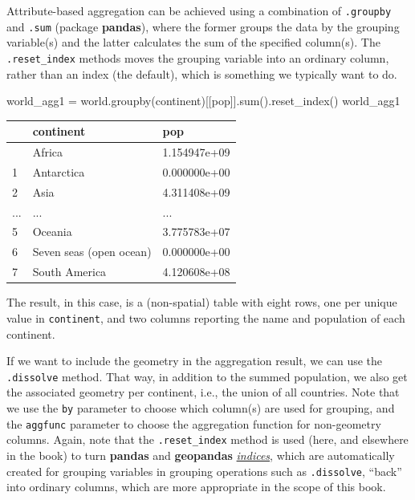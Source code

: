 \documentclass[
  letterpaper,
]{krantz}
\newenvironment{Shaded}{\begin{snugshade}}{\end{snugshade}}
\newcommand{\BuiltInTok}[1]{\textcolor[rgb]{0.00,0.23,0.31}{#1}}
\newcommand{\NormalTok}[1]{\textcolor[rgb]{0.00,0.23,0.31}{#1}}
\newcommand{\OperatorTok}[1]{\textcolor[rgb]{0.37,0.37,0.37}{#1}}
\newcommand{\StringTok}[1]{\textcolor[rgb]{0.13,0.47,0.30}{#1}}
\begin{document}
Attribute-based aggregation can be achieved using a combination of
\texttt{.groupby} and \texttt{.sum} (package \textbf{pandas}), where the
former groups the data by the grouping variable(s) and the latter
calculates the sum of the specified column(s). The
\texttt{.reset\_index} methods moves the grouping variable into an
ordinary column, rather than an index (the default), which is something
we typically want to do.

\begin{Shaded}
\begin{Highlighting}[]
\NormalTok{world\_agg1 }\OperatorTok{=}\NormalTok{ world.groupby(}\StringTok{\textquotesingle{}continent\textquotesingle{}}\NormalTok{)[[}\StringTok{\textquotesingle{}pop\textquotesingle{}}\NormalTok{]].}\BuiltInTok{sum}\NormalTok{().reset\_index()}
\NormalTok{world\_agg1}
\end{Highlighting}
\end{Shaded}

\begin{longtable}[]{@{}lll@{}}
\toprule\noalign{}
& continent & pop \\
\midrule\noalign{}
\endhead
\bottomrule\noalign{}
\endlastfoot
0 & Africa & 1.154947e+09 \\
1 & Antarctica & 0.000000e+00 \\
2 & Asia & 4.311408e+09 \\
... & ... & ... \\
5 & Oceania & 3.775783e+07 \\
6 & Seven seas (open ocean) & 0.000000e+00 \\
7 & South America & 4.120608e+08 \\
\end{longtable}

The result, in this case, is a (non-spatial) table with eight rows, one
per unique value in \texttt{continent}, and two columns reporting the
name and population of each continent.

If we want to include the geometry in the aggregation result, we can use
the \texttt{.dissolve} method. That way, in addition to the summed
population, we also get the associated geometry per continent, i.e., the
union of all countries. Note that we use the \texttt{by} parameter to
choose which column(s) are used for grouping, and the \texttt{aggfunc}
parameter to choose the aggregation function for non-geometry columns.
Again, note that the \texttt{.reset\_index} method is used (here, and
elsewhere in the book) to turn \textbf{pandas} and \textbf{geopandas}
\href{https://pandas.pydata.org/docs/reference/api/pandas.Index.html}{\emph{indices}},
which are automatically created for grouping variables in grouping
operations such as \texttt{.dissolve}, ``back'' into ordinary columns,
which are more appropriate in the scope of this book.
\end{document}
